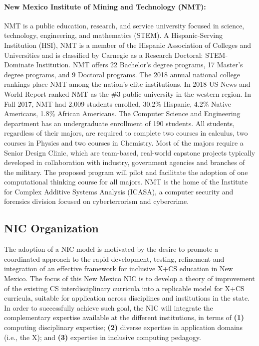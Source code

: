 \paragraph{New Mexico Institute of Mining and Technology (NMT):}
NMT is a public education, research, and service university focused in science, technology, engineering, and mathematics (STEM). A Hispanic-Serving Institution (HSI), NMT is a member of the Hispanic Association of Colleges and Universities and is classified by Carnegie as a Research Doctoral: STEM-Dominate Institution. NMT offers 22 Bachelor’s degree programs, 17 Master’s degree programs, and 9 Doctoral programs. The 2018 annual national college rankings place NMT among the nation’s elite institutions. In 2018 US News and World Report ranked NMT as the \#3 public university in the western region. In Fall
2017, NMT had 2,009 students enrolled, 30.2\% Hispanic, 4.2\% Native Americans, 1.8\% African Americans.
The Computer Science and Engineering department has an undergraduate enrollment of 190 students. All
students, regardless of their majors, are required to complete two courses in calculus, two courses in
Physics and two courses in Chemistry. Most of the majors require a Senior Design Clinic, which are team-based,
real-world capstone projects typically developed in collaboration with industry, government agencies
and branches of the military. The proposed program will pilot and facilitate the adoption of one computational thinking course for all majors. NMT is the home of the Institute for Complex Additive Systems Analysis (ICASA), a computer security and forensics division focused on cyberterrorism and cybercrime.


\subsection{NIC Organization}
 
The adoption of a NIC model is motivated by the desire to promote a coordinated approach to the rapid development, testing, refinement and integration of an effective framework for inclusive X+CS education in New Mexico.
The focus of this New Mexico NIC is to develop a theory of improvement of the existing CS interdisciplinary curricula into a replicable model for X+CS curricula, suitable for application across disciplines and institutions in the state. In order to successfully achieve such goal, the NIC will integrate the complementary expertise available at the different institutions, in terms of 
{\bf (1)} computing disciplinary expertise; {\bf (2)} diverse expertise in application domains (i.e., the X); and 
{\bf (3)} expertise in inclusive computing pedagogy. 

